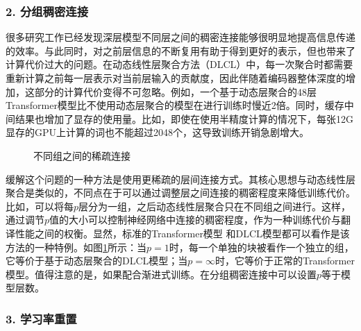 
\subsubsection{2. 分组稠密连接}

\parinterval 很多研究工作已经发现深层模型不同层之间的稠密连接能够很明显地提高信息传递的效率。与此同时，对之前层信息的不断复用有助于得到更好的表示，但也带来了计算代价过大的问题。在动态线性层聚合方法（DLCL）中，每一次聚合时都需要重新计算之前每一层表示对当前层输入的贡献度，因此伴随着编码器整体深度的增加，这部分的计算代价变得不可忽略。例如，一个基于动态层聚合的48层Transformer模型比不使用动态层聚合的模型在进行训练时慢近2倍。同时，缓存中间结果也增加了显存的使用量。比如，即使在使用半精度计算的情况下，每张12G显存的GPU上计算的词也不能超过2048个，这导致训练开销急剧增大。

\begin{figure}[htp]
\centering

\caption{不同组之间的稀疏连接}
\label{fig:15-16}
\end{figure}

\parinterval 缓解这个问题的一种方法是使用更稀疏的层间连接方式。其核心思想与动态线性层聚合是类似的，不同点在于可以通过调整层之间连接的稠密程度来降低训练代价。比如，可以将每$p$层分为一组，之后动态线性层聚合只在不同组之间进行。这样，通过调节$p$值的大小可以控制神经网络中连接的稠密程度，作为一种训练代价与翻译性能之间的权衡。显然，标准的Transformer模型 和DLCL模型都可以看作是该方法的一种特例。如图\ref{fig:15-16}所示：当$p=1$时，每一个单独的块被看作一个独立的组，它等价于基于动态层聚合的DLCL模型；当$p=\infty$时，它等价于正常的Transformer模型。值得注意的是，如果配合渐进式训练。在分组稠密连接中可以设置$p$等于模型层数。


\subsubsection{3. 学习率重置}

